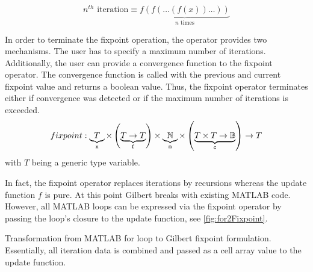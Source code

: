 \begin{displaymath}
  n^{th}\text{ iteration}\equiv\underbrace{f(f(\ldots(f(x))\ldots))}_{\text{$n$ times}}
\end{displaymath}

In order to terminate the fixpoint operation, the operator provides two mechanisms.
The user has to specify a maximum number  of iterations.
Additionally, the user can provide a convergence function  to the fixpoint operator.
The convergence function is called with the previous and current fixpoint value and returns a boolean value.
Thus, the fixpoint operator terminates either if convergence was detected or if the maximum number of iterations is exceeded.
\begin{equation}
\label{eq:fixpoint}
fixpoint: \underbrace{T}_{\text{\texttt{x}}} \times \left( \underbrace{T \rightarrow T}_{\text{\texttt{f}}} \right) \times \underbrace{\mathbb{N}}_{\text{\texttt{m}}} \times \left(\underbrace{T\times T \rightarrow \mathbb{B}}_{\text{\texttt{c}}} \right) \rightarrow T
\end{equation}
with $T$ being a generic type variable.

In fact, the fixpoint operator replaces iterations by recursions whereas the update function $f$ is pure. At this point Gilbert breaks with existing MATLAB code. However, all MATLAB loops can be expressed via the fixpoint operator by passing the loop's closure to the update function, see \cref{fig:for2Fixpoint}.

\begin{listing}
  \centering
  \caption{Transformation from MATLAB for loop  to Gilbert fixpoint  formulation. Essentially, all iteration data is combined and passed as a cell array value to the update function.}
  \label{fig:for2Fixpoint}
\end{listing}

